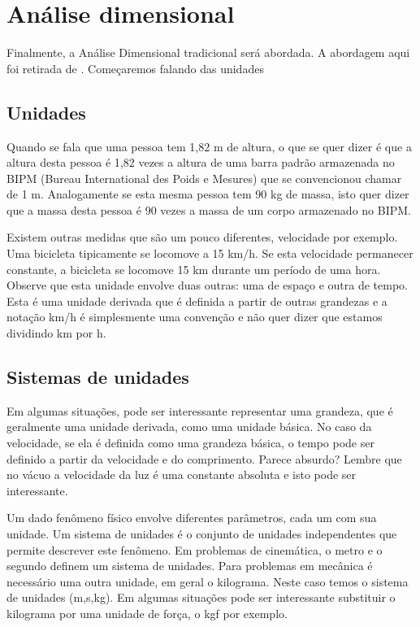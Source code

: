\section{Análise dimensional}
\label{sec:adim}

Finalmente, a Análise Dimensional tradicional será abordada. A abordagem aqui foi retirada de . Começaremos falando das unidades





\subsection{Unidades}

Quando se fala que uma pessoa tem 1,82 m de altura, o que se quer dizer é que a altura desta pessoa é 1,82 vezes a altura de uma barra padrão armazenada no BIPM (Bureau International des Poids e Mesures) que se convencionou chamar de 1 m. Analogamente se esta mesma pessoa tem 90 kg de massa, isto quer dizer que a massa desta pessoa é 90 vezes a massa de um corpo armazenado no BIPM.

Existem outras medidas que são um pouco diferentes, velocidade por exemplo. Uma bicicleta tipicamente se locomove a 15 km/h. Se esta velocidade permanecer constante, a bicicleta se locomove 15 km durante um período de uma hora. Observe que esta unidade envolve duas outras: uma de espaço e outra de tempo. Esta é uma unidade derivada que é definida a partir de outras grandezas e a notação km/h é simplesmente uma convenção e não quer dizer que estamos dividindo km por h.

\subsection{Sistemas de unidades}

Em algumas situações, pode ser interessante representar uma grandeza, que é geralmente uma unidade derivada, como uma unidade básica. No caso da velocidade, se ela é definida como uma grandeza básica, o tempo pode ser definido a partir da velocidade e do comprimento. Parece absurdo? Lembre que no vácuo a velocidade da luz é uma constante absoluta e isto pode ser interessante.

Um dado fenômeno físico envolve diferentes parâmetros, cada um com sua unidade. Um sistema de unidades é o conjunto de unidades independentes que permite descrever este fenômeno. Em problemas de cinemática, o metro e o segundo definem um sistema de unidades. Para problemas em mecânica é necessário uma outra unidade, em geral o kilograma. Neste caso temos o sistema de unidades (m,s,kg). Em algumas situações pode ser interessante substituir o kilograma por uma unidade de força, o kgf por exemplo.

